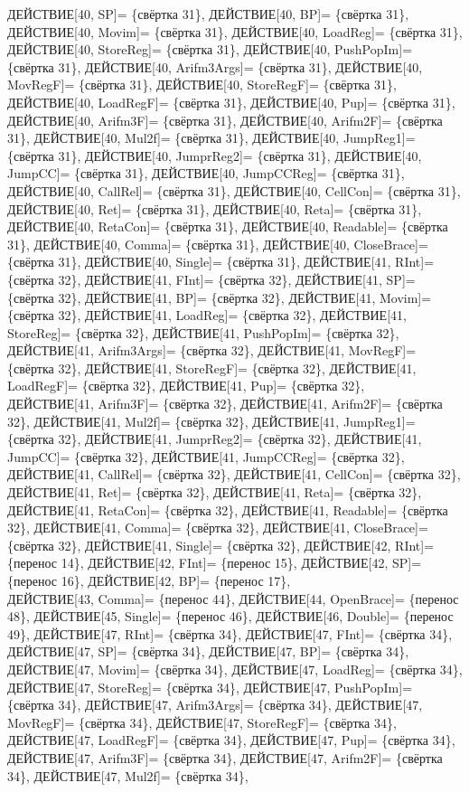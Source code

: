 \documentclass[a0]{a0poster}
\begin{document}
ДЕЙСТВИЕ[40, SP]= \{свёртка 31\}, ДЕЙСТВИЕ[40, BP]= \{свёртка 31\}, ДЕЙСТВИЕ[40, Movim]= \{свёртка 31\}, ДЕЙСТВИЕ[40, LoadReg]= \{свёртка 31\}, ДЕЙСТВИЕ[40, StoreReg]= \{свёртка 31\}, ДЕЙСТВИЕ[40, PushPopIm]= \{свёртка 31\}, ДЕЙСТВИЕ[40, Arifm3Args]= \{свёртка 31\}, ДЕЙСТВИЕ[40, MovRegF]= \{свёртка 31\}, ДЕЙСТВИЕ[40, StoreRegF]= \{свёртка 31\}, ДЕЙСТВИЕ[40, LoadRegF]= \{свёртка 31\}, ДЕЙСТВИЕ[40, Pup]= \{свёртка 31\}, ДЕЙСТВИЕ[40, Arifm3F]= \{свёртка 31\}, ДЕЙСТВИЕ[40, Arifm2F]= \{свёртка 31\}, ДЕЙСТВИЕ[40, Mul2f]= \{свёртка 31\}, ДЕЙСТВИЕ[40, JumpReg1]= \{свёртка 31\}, ДЕЙСТВИЕ[40, JumprReg2]= \{свёртка 31\}, ДЕЙСТВИЕ[40, JumpCC]= \{свёртка 31\}, ДЕЙСТВИЕ[40, JumpCCReg]= \{свёртка 31\}, ДЕЙСТВИЕ[40, CallRel]= \{свёртка 31\}, ДЕЙСТВИЕ[40, CellCon]= \{свёртка 31\}, \\
ДЕЙСТВИЕ[40, Ret]= \{свёртка 31\}, ДЕЙСТВИЕ[40, Reta]= \{свёртка 31\}, ДЕЙСТВИЕ[40, RetaCon]= \{свёртка 31\}, ДЕЙСТВИЕ[40, Readable]= \{свёртка 31\}, ДЕЙСТВИЕ[40, Comma]= \{свёртка 31\}, ДЕЙСТВИЕ[40, CloseBrace]= \{свёртка 31\}, ДЕЙСТВИЕ[40, Single]= \{свёртка 31\}, ДЕЙСТВИЕ[41, RInt]= \{свёртка 32\}, ДЕЙСТВИЕ[41, FInt]= \{свёртка 32\}, ДЕЙСТВИЕ[41, SP]= \{свёртка 32\}, ДЕЙСТВИЕ[41, BP]= \{свёртка 32\}, ДЕЙСТВИЕ[41, Movim]= \{свёртка 32\}, ДЕЙСТВИЕ[41, LoadReg]= \{свёртка 32\}, ДЕЙСТВИЕ[41, StoreReg]= \{свёртка 32\}, ДЕЙСТВИЕ[41, PushPopIm]= \{свёртка 32\}, ДЕЙСТВИЕ[41, Arifm3Args]= \{свёртка 32\}, ДЕЙСТВИЕ[41, MovRegF]= \{свёртка 32\}, ДЕЙСТВИЕ[41, StoreRegF]= \{свёртка 32\}, ДЕЙСТВИЕ[41, LoadRegF]= \{свёртка 32\}, ДЕЙСТВИЕ[41, Pup]= \{свёртка 32\}, \\
ДЕЙСТВИЕ[41, Arifm3F]= \{свёртка 32\}, ДЕЙСТВИЕ[41, Arifm2F]= \{свёртка 32\}, ДЕЙСТВИЕ[41, Mul2f]= \{свёртка 32\}, ДЕЙСТВИЕ[41, JumpReg1]= \{свёртка 32\}, ДЕЙСТВИЕ[41, JumprReg2]= \{свёртка 32\}, ДЕЙСТВИЕ[41, JumpCC]= \{свёртка 32\}, ДЕЙСТВИЕ[41, JumpCCReg]= \{свёртка 32\}, ДЕЙСТВИЕ[41, CallRel]= \{свёртка 32\}, ДЕЙСТВИЕ[41, CellCon]= \{свёртка 32\}, ДЕЙСТВИЕ[41, Ret]= \{свёртка 32\}, ДЕЙСТВИЕ[41, Reta]= \{свёртка 32\}, ДЕЙСТВИЕ[41, RetaCon]= \{свёртка 32\}, ДЕЙСТВИЕ[41, Readable]= \{свёртка 32\}, ДЕЙСТВИЕ[41, Comma]= \{свёртка 32\}, ДЕЙСТВИЕ[41, CloseBrace]= \{свёртка 32\}, ДЕЙСТВИЕ[41, Single]= \{свёртка 32\}, ДЕЙСТВИЕ[42, RInt]= \{перенос 14\}, ДЕЙСТВИЕ[42, FInt]= \{перенос 15\}, ДЕЙСТВИЕ[42, SP]= \{перенос 16\}, ДЕЙСТВИЕ[42, BP]= \{перенос 17\}, \\
ДЕЙСТВИЕ[43, Comma]= \{перенос 44\}, ДЕЙСТВИЕ[44, OpenBrace]= \{перенос 48\}, ДЕЙСТВИЕ[45, Single]= \{перенос 46\}, ДЕЙСТВИЕ[46, Double]= \{перенос 49\}, ДЕЙСТВИЕ[47, RInt]= \{свёртка 34\}, ДЕЙСТВИЕ[47, FInt]= \{свёртка 34\}, ДЕЙСТВИЕ[47, SP]= \{свёртка 34\}, ДЕЙСТВИЕ[47, BP]= \{свёртка 34\}, ДЕЙСТВИЕ[47, Movim]= \{свёртка 34\}, ДЕЙСТВИЕ[47, LoadReg]= \{свёртка 34\}, ДЕЙСТВИЕ[47, StoreReg]= \{свёртка 34\}, ДЕЙСТВИЕ[47, PushPopIm]= \{свёртка 34\}, ДЕЙСТВИЕ[47, Arifm3Args]= \{свёртка 34\}, ДЕЙСТВИЕ[47, MovRegF]= \{свёртка 34\}, ДЕЙСТВИЕ[47, StoreRegF]= \{свёртка 34\}, ДЕЙСТВИЕ[47, LoadRegF]= \{свёртка 34\}, ДЕЙСТВИЕ[47, Pup]= \{свёртка 34\}, ДЕЙСТВИЕ[47, Arifm3F]= \{свёртка 34\}, ДЕЙСТВИЕ[47, Arifm2F]= \{свёртка 34\}, ДЕЙСТВИЕ[47, Mul2f]= \{свёртка 34\}, \\
\end{document}
